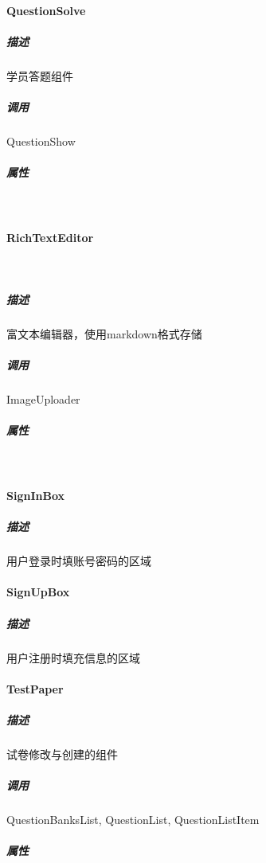 \documentclass{article}
\begin{document}
        \paragraph{QuestionSolve}
            \subparagraph{描述}
                学员答题组件
            \subparagraph{调用}
                QuestionShow
            \subparagraph{属性} \ \par
                \par
                \par
                \par
       
       \paragraph{RichTextEditor} \ \par
            \subparagraph{描述}
                富文本编辑器，使用markdown格式存储
            \subparagraph{调用} ImageUploader
            \subparagraph{属性} \ \par
                \par
                \par
                \par
                 \par
                
        \paragraph{SignInBox}
            \subparagraph{描述}
                用户登录时填账号密码的区域
          
        \paragraph{SignUpBox}
            \subparagraph{描述}
                用户注册时填充信息的区域
        
        \paragraph{TestPaper}
            \subparagraph{描述}
                试卷修改与创建的组件
            \subparagraph{调用}
                QuestionBanksList, QuestionList, QuestionListItem
            \subparagraph{属性}\ \par
                
\end{document}
